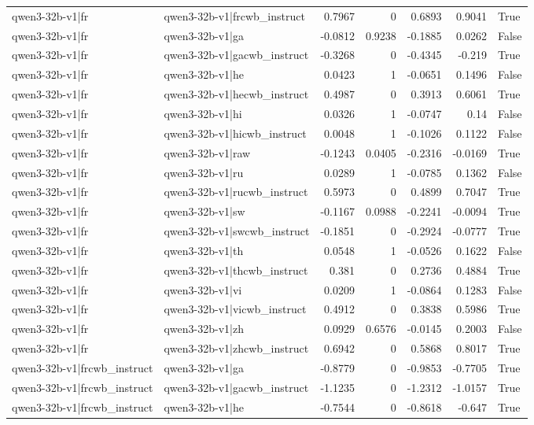 \begin{table}
\begin{tabular}{l l r r r r l}
qwen3-32b-v1|fr & qwen3-32b-v1|frcwb_instruct & 0.7967 & 0 & 0.6893 & 0.9041 & True \\
qwen3-32b-v1|fr & qwen3-32b-v1|ga & -0.0812 & 0.9238 & -0.1885 & 0.0262 & False \\
qwen3-32b-v1|fr & qwen3-32b-v1|gacwb_instruct & -0.3268 & 0 & -0.4345 & -0.219 & True \\
qwen3-32b-v1|fr & qwen3-32b-v1|he & 0.0423 & 1 & -0.0651 & 0.1496 & False \\
qwen3-32b-v1|fr & qwen3-32b-v1|hecwb_instruct & 0.4987 & 0 & 0.3913 & 0.6061 & True \\
qwen3-32b-v1|fr & qwen3-32b-v1|hi & 0.0326 & 1 & -0.0747 & 0.14 & False \\
qwen3-32b-v1|fr & qwen3-32b-v1|hicwb_instruct & 0.0048 & 1 & -0.1026 & 0.1122 & False \\
qwen3-32b-v1|fr & qwen3-32b-v1|raw & -0.1243 & 0.0405 & -0.2316 & -0.0169 & True \\
qwen3-32b-v1|fr & qwen3-32b-v1|ru & 0.0289 & 1 & -0.0785 & 0.1362 & False \\
qwen3-32b-v1|fr & qwen3-32b-v1|rucwb_instruct & 0.5973 & 0 & 0.4899 & 0.7047 & True \\
qwen3-32b-v1|fr & qwen3-32b-v1|sw & -0.1167 & 0.0988 & -0.2241 & -0.0094 & True \\
qwen3-32b-v1|fr & qwen3-32b-v1|swcwb_instruct & -0.1851 & 0 & -0.2924 & -0.0777 & True \\
qwen3-32b-v1|fr & qwen3-32b-v1|th & 0.0548 & 1 & -0.0526 & 0.1622 & False \\
qwen3-32b-v1|fr & qwen3-32b-v1|thcwb_instruct & 0.381 & 0 & 0.2736 & 0.4884 & True \\
qwen3-32b-v1|fr & qwen3-32b-v1|vi & 0.0209 & 1 & -0.0864 & 0.1283 & False \\
qwen3-32b-v1|fr & qwen3-32b-v1|vicwb_instruct & 0.4912 & 0 & 0.3838 & 0.5986 & True \\
qwen3-32b-v1|fr & qwen3-32b-v1|zh & 0.0929 & 0.6576 & -0.0145 & 0.2003 & False \\
qwen3-32b-v1|fr & qwen3-32b-v1|zhcwb_instruct & 0.6942 & 0 & 0.5868 & 0.8017 & True \\
qwen3-32b-v1|frcwb_instruct & qwen3-32b-v1|ga & -0.8779 & 0 & -0.9853 & -0.7705 & True \\
qwen3-32b-v1|frcwb_instruct & qwen3-32b-v1|gacwb_instruct & -1.1235 & 0 & -1.2312 & -1.0157 & True \\
qwen3-32b-v1|frcwb_instruct & qwen3-32b-v1|he & -0.7544 & 0 & -0.8618 & -0.647 & True \\

\end{tabular}
\end{table}
